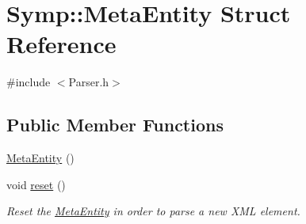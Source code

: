 \hypertarget{struct_symp_1_1_meta_entity}{\section{Symp\-:\-:Meta\-Entity Struct Reference}
\label{struct_symp_1_1_meta_entity}
}


{\ttfamily \#include $<$Parser.\-h$>$}

\subsection*{Public Member Functions}
\begin{DoxyCompactItemize}
\item 
\hyperlink{struct_symp_1_1_meta_entity_a7e9971ebaa14005dd40fc7668a8f20d5}{Meta\-Entity} ()
\item 
void \hyperlink{struct_symp_1_1_meta_entity_a85b764ed5173ec3de1002fc44da3c708}{reset} ()
\begin{DoxyCompactList}\small\item\em Reset the \hyperlink{struct_symp_1_1_meta_entity}{Meta\-Entity} in order to parse a new X\-M\-L element. \end{DoxyCompactList}\end{DoxyCompactItemize}
